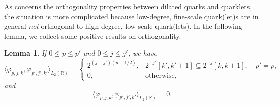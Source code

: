 \documentclass{article}
\newtheorem{lemma}[propo]{Lemma}
\begin{document}
As concerns the orthogonality properties between dilated quarks and quarklets, the situation is more complicated because low-degree, fine-scale quark(let)s are in general \emph{not} orthogonal to high-degree, low-scale quark(lets). In the following lemma, we collect some positive results on orthogonality.
\begin{lemma}
If $0\le p\le p'$ and $0\le j\le j'$, we have
\begin{equation}\label{eq:phipjkphippjpkpproducts}
\langle\varphi_{p,j,k},\varphi_{p',j',k'}\rangle_{L_2(\mathbb R)}
=
\begin{cases}
2^{(j-j')(p+1/2)},&2^{-j'}[k',k'+1]\subseteq 2^{-j}[k,k+1],\quad p'=p,\\
0,&\text{otherwise},
\end{cases}
\end{equation}
and
\begin{equation}\label{eq:phipjkpsippjpkpproducts}
\langle\varphi_{p,j,k},\psi_{p',j',k'}\rangle_{L_2(\mathbb R)}
=
0.
\end{equation}
\end{lemma}
\end{document}
